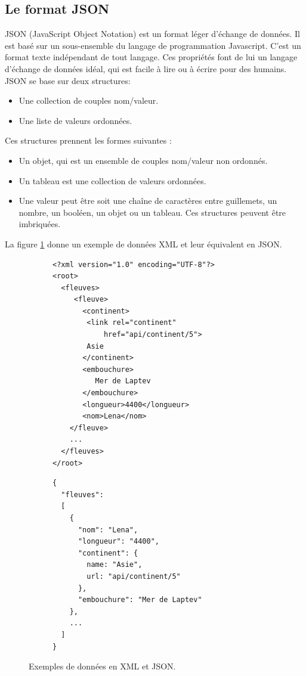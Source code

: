 \subsection{Le format JSON}
JSON (JavaScript Object Notation) est un format léger d'échange de données. Il est basé sur un sous-ensemble du langage de programmation Javascript. C'est un format texte indépendant de tout langage.
Ces propriétés font de lui un langage d'échange de données idéal, qui est facile à lire ou à écrire pour des humains. 
JSON se base sur deux structures:
\begin{itemize}
	\item Une collection de couples nom/valeur. 
	\item Une liste de valeurs ordonnées. 
\end{itemize}
Ces structures prennent les formes suivantes :
\begin{itemize}
	\item Un objet, qui est un ensemble de couples nom/valeur non ordonnés. 
	\item Un tableau est une collection de valeurs ordonnées. 
	\item Une valeur peut être soit une chaîne de caractères entre guillemets, un nombre, un booléen, un objet ou un tableau. Ces structures peuvent être imbriquées.
\end{itemize}
La figure \ref{fig:JSONXML} donne un exemple de données XML et leur équivalent en JSON.

\lstset{style=JSON}

\begin{figure}[h!]
  \centering
  \begin{subfigure}[b]{0.52\linewidth}
      \begin{lstlisting}[caption=Exemple en XML]
<?xml version="1.0" encoding="UTF-8"?>
<root>
  <fleuves>
     <fleuve>
       <continent>
        <link rel="continent" 
       		href="api/continent/5">
       	Asie
       </continent>
       <embouchure>
          Mer de Laptev
       </embouchure>
       <longueur>4400</longueur>
       <nom>Lena</nom>
    </fleuve>
    ...
  </fleuves>
</root>
\end{lstlisting}
  \end{subfigure}\hfill%
  \begin{subfigure}[b]{0.40\linewidth}
      \begin{lstlisting}[caption=Equivalent en JSON]
{
  "fleuves":
  [
    {
      "nom": "Lena",
      "longueur": "4400",
      "continent": {
      	name: "Asie",
      	url: "api/continent/5"
      },
      "embouchure": "Mer de Laptev"
    },
    ...
  ]
}       
\end{lstlisting}
\end{subfigure}\hfill%
\caption{Exemples de données en XML et JSON.}
\label{fig:JSONXML}
\end{figure}


